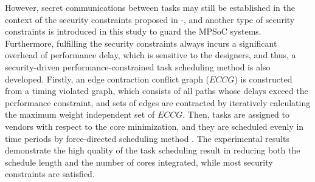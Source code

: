 \documentclass[conference]{IEEEtran}
\begin{document}



However, secret communications between tasks may still be established in the context of the security constraints proposed in \cite{article:JR3}-\cite{article:NW}, and another type of security constraints is introduced in this study to guard the MPSoC systems. Furthermore, fulfilling the security constraints always incurs a significant overhead of performance delay, which is sensitive to the designers, and thus, a security-driven performance-constrained task scheduling method is also developed. Firstly, an edge contraction conflict graph ($ECCG$) is constructed from a timing violated graph, which consists of all paths whose delays exceed the performance constraint, and sets of edges are contracted by iteratively calculating the maximum weight independent set of $ECCG$. Then, tasks are assigned to vendors with respect to the core minimization, and they are scheduled evenly in time periods by force-directed scheduling method \cite{article:PP}. The experimental results demonstrate the high quality of the task scheduling result in reducing both the schedule length and the number of cores integrated, while most security constraints are satisfied.
\end{document}
